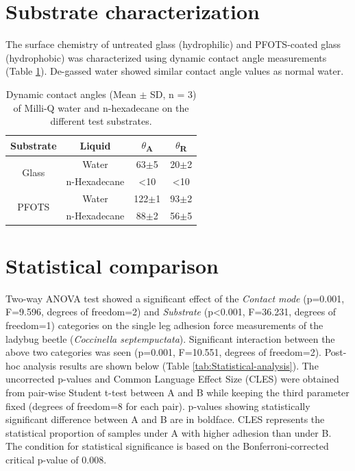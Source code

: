 \documentclass[english]{achemso}
\providecommand{\tabularnewline}{\\}
\begin{document}
\section{Substrate characterization}

The surface chemistry of untreated glass (hydrophilic) and PFOTS-coated glass (hydrophobic) was characterized using dynamic contact angle measurements (Table \ref{tab:Contact-Angles}). De-gassed water showed similar contact angle values as normal water.
\begin{table}[H]
\centering{}%
\begin{tabular}{|c|c|c|c|}
\hline 
Substrate & Liquid & \ensuremath{\theta}\textsubscript{A} & \ensuremath{\theta}\textsubscript{R}\tabularnewline
\hline 
\hline 
\multirow{2}{*}{Glass} & Water & 63\ensuremath{\pm}5\textdegree{} & 20\ensuremath{\pm}2\textdegree{}\tabularnewline
\cline{2-4} \cline{3-4} \cline{4-4} 
 & n-Hexadecane & <10\textdegree{} & <10\textdegree{}\tabularnewline
\hline 
\multirow{2}{*}{PFOTS} & Water & 122\ensuremath{\pm}1\textdegree{} & 93\ensuremath{\pm}2\textdegree{}\tabularnewline
\cline{2-4} \cline{3-4} \cline{4-4} 
 & n-Hexadecane & 88\ensuremath{\pm}2\textdegree{} & 56\ensuremath{\pm}5\textdegree{}\tabularnewline
\hline 
\end{tabular}\caption{Dynamic contact angles (Mean \ensuremath{\pm} SD, n = 3) of Milli-Q water and n-hexadecane on the different test substrates. \label{tab:Contact-Angles}}
\end{table}


\section{Statistical comparison}

Two-way ANOVA test showed a significant effect of the \emph{Contact mode} (p=0.001, F=9.596, degrees of freedom=2) 
and \emph{Substrate} (p<0.001, F=36.231, degrees of freedom=1) categories on the single leg adhesion force measurements
of the ladybug beetle (\emph{Coccinella septempuctata}). Significant interaction between the above two categories was seen (p=0.001, F=10.551, degrees of freedom=2). Post-hoc analysis results are shown below (Table \ref{tab:Statistical-analysis}).
The uncorrected p-values and Common Language Effect Size (CLES) were
obtained from pair-wise Student t-test between A and B while
keeping the third parameter fixed (degrees of freedom=8 for each pair). p-values showing statistically
significant difference between A and B are in boldface. 
CLES represents the statistical proportion of samples under A with higher adhesion than under B. The condition
for statistical significance is based on the Bonferroni-corrected
critical p-value of 0.008.
\end{document}
